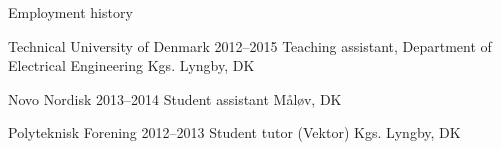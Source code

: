 \begin{rSection}{Employment history}
    
    \begin{rSubsectionNoList}
        {Technical University of Denmark} %
        {2012--2015} %
        {Teaching assistant, Department of Electrical Engineering} %
        {Kgs. Lyngby, DK}
    \end{rSubsectionNoList}
    
    
    \begin{rSubsectionNoList}
        {Novo Nordisk} %
        {2013--2014} %
        {Student assistant} %
        {Måløv, DK}
    \end{rSubsectionNoList}
    
    
    \begin{rSubsectionNoList}
        {Polyteknisk Forening} %
        {2012--2013} %
        {Student tutor (Vektor)} %
        {Kgs. Lyngby, DK}
    \end{rSubsectionNoList}
    

	
	

\end{rSection}
